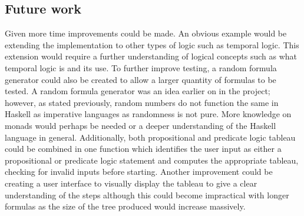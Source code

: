 \documentclass{article}%
\begin{document}
\subsection{Future work}
Given more time improvements could be made. An obvious example would be extending the implementation to other types of logic such as temporal logic. This extension would require a further understanding of logical concepts such as what temporal logic is and its use. To further improve testing, a random formula generator could also be created to allow a larger quantity of formulas to be tested. A random formula generator was an idea earlier on in the project; however, as stated previously, random numbers do not function the same in Haskell as imperative languages as randomness is not pure. More knowledge on monads would perhaps be needed or a deeper understanding of the Haskell language in general. Additionally, both propositional and predicate logic tableau could be combined in one function which identifies the user input as either a propositional or predicate logic statement and computes the appropriate tableau, checking for invalid inputs before starting. Another improvement could be creating a user interface to visually display the tableau to give a clear understanding of the steps although this could become impractical with longer formulas as the size of the tree produced would increase massively. 


\end{document}
